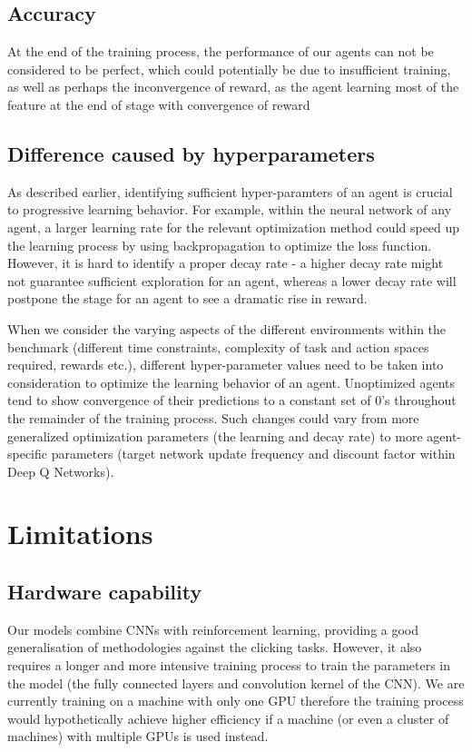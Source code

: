 \documentclass[10pt,journal,compsoc]{IEEEtran}
\begin{document}
\subsection{Accuracy}
At the end of the training process, the performance of our agents can not be considered to be perfect, which could potentially be due to insufficient training, as well as perhaps the inconvergence of reward, as the agent learning most of the feature at the end of stage with convergence of reward 

\subsection{Difference caused by hyperparameters}
As described earlier, identifying sufficient hyper-paramters of an agent is crucial to progressive learning behavior. For example, within the neural network of any agent, a larger learning rate for the relevant optimization method could speed up the learning process by using backpropagation to optimize the loss function. However, it is hard to identify a proper decay rate - a higher decay rate might not guarantee sufficient exploration for an agent, whereas a lower decay rate will postpone the stage for an agent to see a dramatic rise in reward.\linebreak

When we consider the varying aspects of the different environments within the benchmark (different time constraints, complexity of task and action spaces required, rewards etc.), different hyper-parameter values need to be taken into consideration to optimize the learning behavior of an agent. Unoptimized agents tend to show convergence of their predictions to a constant set of 0’s throughout the remainder of the training process. Such changes could vary from more generalized optimization parameters (the learning and decay rate) to more agent-specific parameters (target network update frequency and discount factor within Deep Q Networks).  

\section{Limitations}

\subsection{Hardware capability}
Our models combine CNNs with reinforcement learning, providing a good generalisation of methodologies against the clicking tasks. However, it also requires a longer and more intensive training process to train the parameters in the model (the fully connected layers and convolution kernel of the CNN). We are currently training on a machine with only one GPU therefore the training process would hypothetically achieve higher efficiency if a machine (or even a cluster of machines) with multiple GPUs is used instead.
\end{document}
